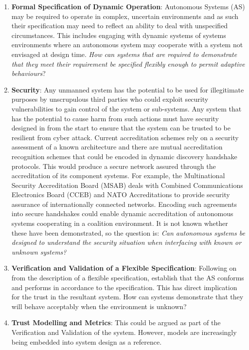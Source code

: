 \begin{enumerate}
  \item \textbf{Formal Specification of Dynamic Operation}: Autonomous Systems (AS) may be required to operate in complex, uncertain environments and as such their specification may need to reflect an ability to deal with unspecified circumstances.
    This includes engaging with dynamic systems of systems environments where an autonomous system may cooperate with a system not envisaged at design time.
    \textit{How can systems that are required to demonstrate that they meet their requirement be specified flexibly enough to permit adaptive behaviours}?
  \item \textbf{Security}: Any unmanned system has the potential to be used for illegitimate purposes by unscrupulous third parties who could exploit security vulnerabilities to gain control of the system or sub-systems.
    Any system that has the potential to cause harm from such actions must have security designed in from the start to ensure that the system can be trusted to be resilient from cyber attack.
    Current accreditation schemes rely on a security assessment of a known architecture and there are mutual accreditation recognition schemes that could be encoded in dynamic discovery handshake protocols.
    This would produce a secure network assured through the accreditation of its component systems.
    For example, the Multinational Security Accreditation Board (MSAB) deals with Combined Communications Electronics Board (CCEB) and NATO Accreditations to provide security assurance of internationally connected networks.
    Encoding such agreements into secure handshakes could enable dynamic accreditation of autonomous systems cooperating in a coalition environment.
    It is not known whether these have been demonstrated, so the question is: \textit{Can autonomous systems be designed to understand the security situation when interfacing with known or unknown systems?}
  \item \textbf{Verification and Validation of a Flexible Specification}: Following on from the description of a flexible specification, establish that the AS conforms and performs in accordance to the specification.
    This has direct implication for the trust in the resultant system.
    How can systems demonstrate that they will behave acceptably when the environment is unknown?
  \item \textbf{Trust Modelling and Metrics}: This could be argued as part of the Verification and Validation of the system.
    However, models are increasingly being embedded into system design as a reference.

\end{enumerate}
